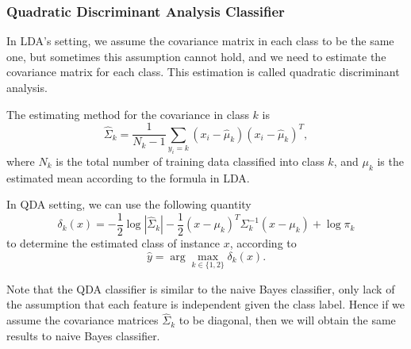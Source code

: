 \documentclass[english]{article}
\begin{document}
\subsubsection{Quadratic Discriminant Analysis Classifier}
\par In LDA's setting, we assume the covariance matrix in each class to be the same one, but sometimes this assumption cannot hold, and we need to estimate the covariance matrix for each class. This estimation is called quadratic discriminant analysis.
\par The estimating method for the covariance in class $k$ is
\begin{equation}
	\hat{\Sigma}_{k} = \frac{1}{N_{k} - 1}\sum_{y_{i} = k}(x_{i} - \hat{\mu}_{k})(x_{i} - \hat{\mu}_{k})^{T},
\end{equation}
where $N_{k}$ is the total number of training data classified into class $k$, and $\mu_{k}$ is the estimated mean according to the formula in LDA.
\par In QDA setting, we can use the following quantity
\begin{equation}
	\delta_{k}(x) = -\frac{1}{2}\log|\hat{\Sigma}_{k}| - \frac{1}{2}(x - \mu_{k})^{T}\Sigma_{k}^{-1}(x - \mu_{k}) + \log\pi_{k}
\end{equation}
to determine the estimated class of instance $x$, according to
\begin{equation}
	\hat{y} = \arg\max_{k\in\{1, 2\}}\delta_{k}(x).
\end{equation}
\par Note that the QDA classifier is similar to the naive Bayes classifier, only lack of the assumption that each feature is independent given the class label. Hence if we assume the covariance matrices $\hat{\Sigma}_{k}$ to be diagonal, then we will obtain the same results to naive Bayes classifier.
\end{document}
